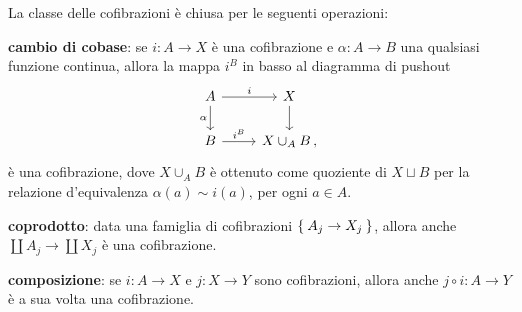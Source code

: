 \begin{exercise}
	La classe delle cofibrazioni è chiusa per le seguenti operazioni:
	\begin{rmnumerate}
		\item \textbf{cambio di cobase}: se $i: A \to X$ è una cofibrazione
		e $\alpha:A \to B$ una qualsiasi funzione continua, allora
		la mappa $i^{B}$ in basso al diagramma di pushout
		\begin{equation*}
			\begin{tikzcd}
			A \ar[r,"i"] \ar[d, "\alpha"'] & X \ar[d] \\
			B \ar[r, "i^{B}"] & X \cup_{A} B\,,  
			\end{tikzcd}
		\end{equation*}
		è una cofibrazione, dove $X \cup_{A} B$ è ottenuto come quoziente di $X \sqcup B$
		per la relazione d'equivalenza $\alpha(a) \sim i(a)$, per ogni $a \in A$.
		
		\item \textbf{coprodotto}: data una famiglia di cofibrazioni 
		$\Set{A_{j} \to X_{j}}$, allora anche $\coprod A_{j} \to \coprod X_{j}$
		è una cofibrazione.
		
		\item \textbf{composizione}: se $i:A \to X$ e $j:X \to Y$ sono
		cofibrazioni, allora anche $j \circ i:A \to Y$ è a sua volta una cofibrazione.
		

\end{rmnumerate}
\end{exercise}
